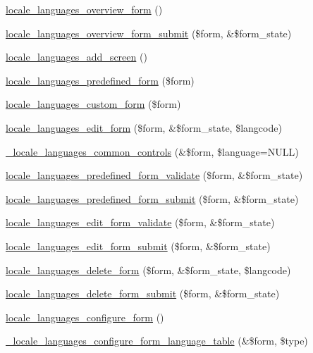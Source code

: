 \begin{DoxyCompactItemize}
\item 
\hyperlink{group__locale_ga6cdda3c5c776e4c263ace510317cdeed}{locale\_\-languages\_\-overview\_\-form} ()
\item 
\hyperlink{group__locale_ga957be3bb6cd02af2ff2acd887fc2b3fe}{locale\_\-languages\_\-overview\_\-form\_\-submit} (\$form, \&\$form\_\-state)
\item 
\hyperlink{group__locale_ga717959709d412fc1039f7436501dbf49}{locale\_\-languages\_\-add\_\-screen} ()
\item 
\hyperlink{group__locale_ga06a3fbf820480d99d755aee5ae6a74dc}{locale\_\-languages\_\-predefined\_\-form} (\$form)
\item 
\hyperlink{group__locale_ga38e919c4e98aba3e12136c2ac35b92f3}{locale\_\-languages\_\-custom\_\-form} (\$form)
\item 
\hyperlink{group__locale_ga32b1bc378b3343f57cf3632acd8701f6}{locale\_\-languages\_\-edit\_\-form} (\$form, \&\$form\_\-state, \$langcode)
\item 
\hyperlink{group__locale_gaa662af294a8422d2b73e6e05288b1b8d}{\_\-locale\_\-languages\_\-common\_\-controls} (\&\$form, \$language=NULL)
\item 
\hyperlink{group__locale_ga4298724abc57b7d2622a2c9642b4f742}{locale\_\-languages\_\-predefined\_\-form\_\-validate} (\$form, \&\$form\_\-state)
\item 
\hyperlink{group__locale_ga83df19c32a63b094d033d0802d74d7cd}{locale\_\-languages\_\-predefined\_\-form\_\-submit} (\$form, \&\$form\_\-state)
\item 
\hyperlink{group__locale_ga0d97a3815fcd49bb49ed59dc77ebb802}{locale\_\-languages\_\-edit\_\-form\_\-validate} (\$form, \&\$form\_\-state)
\item 
\hyperlink{group__locale_ga749200a912dbb5d31c5403d3fd909741}{locale\_\-languages\_\-edit\_\-form\_\-submit} (\$form, \&\$form\_\-state)
\item 
\hyperlink{group__locale_gae91146ea73b4fde0a5584e4a9e502903}{locale\_\-languages\_\-delete\_\-form} (\$form, \&\$form\_\-state, \$langcode)
\item 
\hyperlink{group__locale_gadbf1eb80de38d65bda55e63699822e3c}{locale\_\-languages\_\-delete\_\-form\_\-submit} (\$form, \&\$form\_\-state)
\item 
\hyperlink{group__locale_gad4a0fb5717a5318793af57ec86169949}{locale\_\-languages\_\-configure\_\-form} ()
\item 
\hyperlink{group__locale_ga3aeae5dacd89af2116019f5964787c48}{\_\-locale\_\-languages\_\-configure\_\-form\_\-language\_\-table} (\&\$form, \$type)

\end{DoxyCompactItemize}
